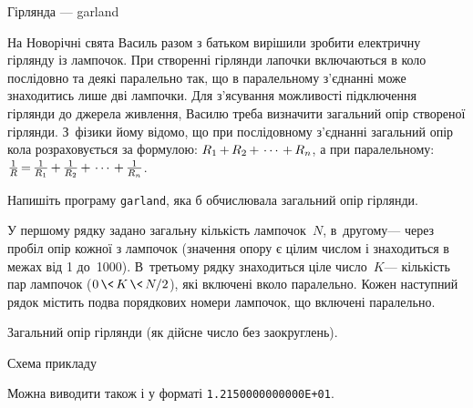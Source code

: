 \begin{problemAllDefault}{Гірлянда --- garland}


На Новорічні свята Василь разом з батьком вирішили зробити електричну гірлянду із лампочок. При створенні гірлянди лапочки включаються в коло послідовно та деякі паралельно так, що в паралельному з’єднанні може знаходитись лише дві лампочки. Для з’ясування можливості підключення гірлянди до джерела живлення, Василю треба визначити загальний опір створеної гірлянди. З~фізики йому відомо, що при послідовному з’єднанні загальний опір кола розраховується за формулою: $R_1\dib{{+}}R_2\dib{{+}}\cdots\dib{{+}}R_n$, а при паралельному: $\frac{1}{R} \dib{{=}} \frac{1}{R_1} \dib{{+}} \frac{1}{R_2} \dib{{+}} \cdots \dib{{+}} \frac{1}{R_n}$.

Напишіть програму \texttt{garland}, яка б обчислювала загальний опір гірлянди.

\InputFile У першому рядку задано загальну кількість лампочок~$N$, в~другому\nolinebreak[3] --- через пробіл опір кожної з лампочок (значення опору є цілим числом і знаходиться в межах від 1 до~1000). В~третьому рядку знаходиться ціле число~$K$\nolinebreak[3] --- кількість пар лампочок ($0\dib{{\<}}K\dib{{\<}}{N/2}$), які включені в\nolinebreak[3] коло паралельно. Кожен наступний рядок містить по\nolinebreak[2] два порядкових номери лампочок, що включені паралельно.

\OutputFile Загальний опір гірлянди (як дійсне число без заокруглень).

\Example

\vspace{-\baselineskip}

\begin{exampleSimpleThree}{6em}{3em}{14.5em}{Схема прикладу}
%
\end{exampleSimpleThree}


\Note %
Можна виводити також і у форматі \texttt{1.2150000000000E+01}.

\end{problemAllDefault}
